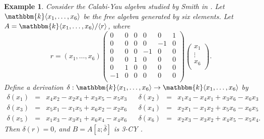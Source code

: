 \documentclass[a4paper]{amsart}
\newtheorem{exa}[thm]{Example}
\begin{document}
\begin{exa} \label{exa1} {\rm Consider the Calabi-Yau algebra studied by Smith in \cite{Sm}. Let ${\mathbbm{k}} \langle x_1,\dots,x_6\rangle$ be the free algebra generated by six elements. Let $A={\mathbbm{k}} \langle x_1,\dots,x_6\rangle/\langle r\rangle$, where $$r=(x_1,\dots,x_6)\left(
                                                                       \begin{array}{cccccc}
                                                                         0 & 0 & 0 & 0 & 0 & 1 \\
                                                                         0 & 0 & 0 & 0 & -1 & 0 \\
                                                                         0 & 0 & 0 & -1 & 0 & 0 \\
                                                                         0 & 0 & 1 & 0 & 0 & 0 \\
                                                                         0 & 1 & 0& 0 & 0 & 0 \\
                                                                         -1 & 0 & 0 & 0 & 0 & 0 \\
                                                                       \end{array}
                                                                     \right)
\left(
  \begin{array}{c}
    x_1 \\
    \vdots \\
    x_6 \\
  \end{array}
\right).$$ Define a derivation $\delta:{\mathbbm{k}} \langle x_1,\dots,x_6\rangle\to {\mathbbm{k}} \langle x_1,\dots,x_6\rangle$ by
$$\begin{array}{ccccccc}
  \delta(x_1)&=&x_4x_2-x_2x_4+x_3x_5-x_5x_3&&\delta(x_2)&=&x_1x_4-x_4x_1+x_3x_6-x_6x_3\\
  \delta(x_3)&=&x_5x_1-x_1x_5+x_6x_2-x_2x_6&&\delta(x_4)&=&x_2x_1-x_1x_2+x_5x_6-x_6x_5\\
  \delta(x_5)&=&x_1x_3-x_3x_1+x_6x_4-x_4x_6&&\delta(x_6)&=&x_2x_3-x_3x_2+x_4x_5-x_5x_4.
  \end{array}
$$ Then $\delta(r)=0$, and $B=A[z;\bar{\delta}]$ is 3-CY \cite{Sm}.}
\end{exa}
\end{document}
